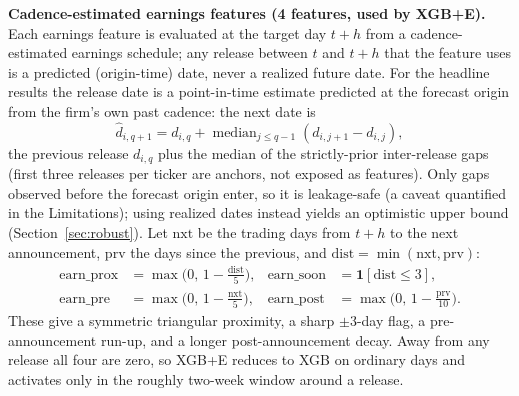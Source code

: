\documentclass[runningheads,a4paper]{llncs}
\begin{document}
\textbf{Cadence-estimated earnings features (4 features, used by XGB+E).} Each earnings feature is evaluated
at the target day $t+h$ from a cadence-estimated earnings schedule; any release between $t$ and $t+h$ that
the feature uses is a predicted (origin-time) date, never a realized future date. For the headline results
the release date is a point-in-time estimate predicted at the forecast origin from the firm's own past
cadence: the next date is
\[ \hat d_{i,q+1} = d_{i,q} + \operatorname{median}_{j\le q-1}\left(d_{i,j+1}-d_{i,j}\right), \]
the previous release $d_{i,q}$ plus the median of the strictly-prior inter-release gaps (first three
releases per ticker are anchors, not exposed as features). Only gaps observed before the forecast origin
enter, so it is leakage-safe (a caveat quantified in the Limitations); using realized dates instead yields
an optimistic upper bound (Section~\ref{sec:robust}). Let $\mathrm{nxt}$ be the trading days from $t+h$ to
the next announcement, $\mathrm{prv}$ the days since the previous, and
$\mathrm{dist}=\min(\mathrm{nxt},\mathrm{prv})$:
\begin{align}
\mathrm{earn\_prox} &= \max\!\Big(0,\,1-\tfrac{\mathrm{dist}}{5}\Big), &
\mathrm{earn\_soon} &= \mathbf{1}[\mathrm{dist}\le 3],\\
\mathrm{earn\_pre} &= \max\!\Big(0,\,1-\tfrac{\mathrm{nxt}}{5}\Big), &
\mathrm{earn\_post} &= \max\!\Big(0,\,1-\tfrac{\mathrm{prv}}{10}\Big).
\end{align}
These give a symmetric triangular proximity, a sharp $\pm 3$-day flag, a pre-announcement run-up, and a
longer post-announcement decay. Away from any release all four are zero, so XGB+E reduces to XGB on ordinary
days and activates only in the roughly two-week window around a release.
\end{document}
